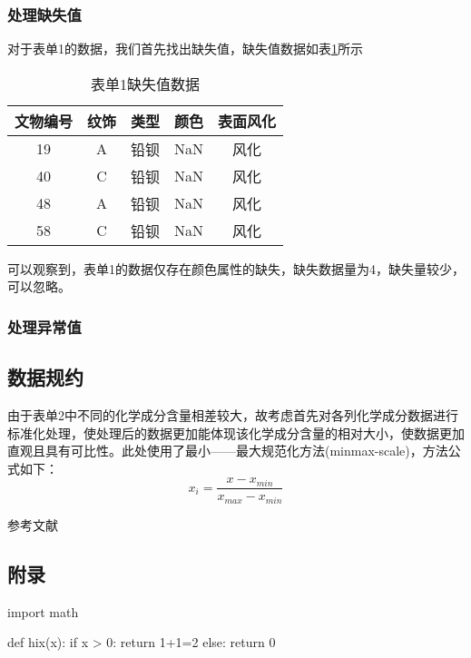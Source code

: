 \documentclass[withoutpreface,bwprint]{cumcmthesis} %
\begin{document}
\subsubsection{处理缺失值}
对于表单1的数据，我们首先找出缺失值，缺失值数据如表\ref{queshi}所示

\begin{table}[!h]
	\centering
	\caption[fh]{表单1缺失值数据}
	\label{queshi}
	\begin{tabular}{@{}ccccc@{}}
		\toprule
		\textbf{文物编号} & \textbf{纹饰} & \textbf{类型} & \textbf{颜色} & \textbf{表面风化} \\ \midrule
		19            & A           & 铅钡          & NaN         & 风化            \\
		40            & C           & 铅钡          & NaN         & 风化            \\
		48            & A           & 铅钡          & NaN         & 风化            \\
		58            & C           & 铅钡          & NaN         & 风化            \\ \bottomrule
	\end{tabular}
\end{table}

可以观察到，表单1的数据仅存在颜色属性的缺失，缺失数据量为4，缺失量较少，可以忽略。

\subsubsection{处理异常值}

\subsection{数据规约}
由于表单2中不同的化学成分含量相差较大，故考虑首先对各列化学成分数据进行标准化处理，使处理后的数据更加能体现该化学成分含量的相对大小，使数据更加直观且具有可比性。此处使用了最小——最大规范化方法(minmax-scale)，方法公式如下： $$ x_{i} = \frac{x-x_{min}}{x_{max}-x_{min}}$$



\newpage
\begin{thebibliography}{9}%
	 参考文献
\end{thebibliography}



\newpage
\begin{appendices}
	

	\section{附录}

\begin{python}
import math

def hix(x):
if x > 0:
return 1+1=2
else:
return 0

\end{python}




\end{appendices}
\end{document}
